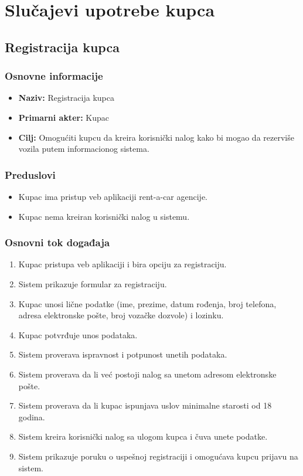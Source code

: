 \documentclass[a4paper,12pt]{article}
\begin{document}
\section{Slučajevi upotrebe kupca}

\subsection{Registracija kupca}

\subsubsection{Osnovne informacije}

\begin{itemize}
    \item \textbf{Naziv:} Registracija kupca
    \item \textbf{Primarni akter:} Kupac
    \item \textbf{Cilj:} Omogućiti kupcu da kreira korisnički nalog kako bi mogao da rezerviše vozila putem informacionog sistema.
\end{itemize}

\subsubsection{Preduslovi}

\begin{itemize}
    \item Kupac ima pristup veb aplikaciji rent-a-car agencije.
    \item Kupac nema kreiran korisnički nalog u sistemu.
\end{itemize}

\subsubsection{Osnovni tok događaja}

\begin{enumerate}
    \item Kupac pristupa veb aplikaciji i bira opciju za registraciju.
    \item Sistem prikazuje formular za registraciju.
    \item Kupac unosi lične podatke (ime, prezime, datum rođenja, broj telefona, adresa elektronske pošte, broj vozačke dozvole) i lozinku.
    \item Kupac potvrđuje unos podataka.
    \item Sistem proverava ispravnost i potpunost unetih podataka.
    \item Sistem proverava da li već postoji nalog sa unetom adresom elektronske pošte.
    \item Sistem proverava da li kupac ispunjava uslov minimalne starosti od 18 godina.
    \item Sistem kreira korisnički nalog sa ulogom kupca i čuva unete podatke.
    \item Sistem prikazuje poruku o uspešnoj registraciji i omogućava kupcu prijavu na sistem.
\end{enumerate}
\end{document}
